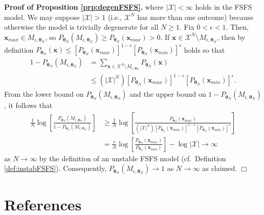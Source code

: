 \documentclass[12pt]{article}
\theoremstyle{definition}
\begin{document}
\textbf{Proof of Proposition \ref{prp:degenFSFS}.} where
\(|\mathcal{X}|<\infty\) holds in the FSFS model. We may suppose
\(|\mathcal{X}|>1\) (i.e., \(\mathcal{X}^N\) has more than one outcome)
because otherwise the model is trivially degenerate for all
\(N \geq 1\). Fix \(0 < \epsilon < 1\). Then,
\(\boldsymbol x_{max} \in M_{\epsilon, \boldsymbol \theta_N}\), so
\(P_{\boldsymbol \theta_N}(M_{\epsilon, \boldsymbol \theta_N}) \ge P_{\boldsymbol \theta_N}(\boldsymbol x_{max}) > 0\).
If
\(\boldsymbol x \in \mathcal{X}^N \setminus M_{\epsilon, \boldsymbol \theta_N}\),
then by definition
\(P_{\boldsymbol \theta_N}(\boldsymbol x) \le [P_{\boldsymbol \theta_N}(\boldsymbol x_{max})]^{1-\epsilon}[P_{\boldsymbol \theta_N}(\boldsymbol x_{min})]^{\epsilon}\)
holds so that
\begin{align*}
1-P_{\boldsymbol \theta_N}(M_{\epsilon, \boldsymbol \theta_N})
& = \sum\limits_{\boldsymbol x \in \mathcal{X}^N \setminus M_{\epsilon, \boldsymbol \theta_N}}P_{\boldsymbol \theta_N}(\boldsymbol x) \\
& \le (|\mathcal{X}|^N)[P_{\boldsymbol \theta_N}(\boldsymbol x_{max})]^{1-\epsilon}[P_{\boldsymbol \theta_N}(\boldsymbol x_{min})]^{\epsilon}.
\end{align*}
From the lower bound on
\(P_{\boldsymbol \theta_N}(M_{\epsilon, \boldsymbol \theta_N})\) and the
upper bound on
\(1-P_{\boldsymbol \theta_N}(M_{\epsilon, \boldsymbol \theta_N})\), it
follows that
\begin{align*}
\frac{1}{N}\log\left[\frac{P_{\boldsymbol \theta_N}(M_{\epsilon, \boldsymbol \theta_N})}{1-P_{\boldsymbol \theta_N}(M_{\epsilon, \boldsymbol \theta_N})}\right] & \ge \frac{1}{N} \log\left[\frac{P_{\boldsymbol\theta_N}(\boldsymbol x_{max})}{(|\mathcal{X}|^N)[P_{\boldsymbol \theta_N}(\boldsymbol x_{max})]^{1-\epsilon}[P_{\boldsymbol \theta_N}(\boldsymbol x_{min})]^{\epsilon}}\right] \\
&= \frac{\epsilon}{N} \log\left[\frac{P_{\boldsymbol \theta_N}(\boldsymbol x_{max})}{P_{\boldsymbol \theta_N}(\boldsymbol x_{min})}\right] - \log |\mathcal{X}| \rightarrow \infty
\end{align*}
as \(N \rightarrow \infty\) by the definition of an unstable FSFS model
(cf.~Definition \ref{def:instabFSFS}). Consequently,
\(P_{\boldsymbol \theta_N}(M_{\epsilon, \boldsymbol \theta_N}) \rightarrow 1\)
as \(N \rightarrow \infty\) as claimed. \hfill \(\Box\)

\clearpage

\section*{References}\label{references}
\end{document}
